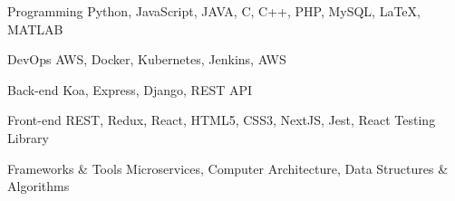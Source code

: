 

\begin{cvskills}

  \cvskill
    {Programming} %
    {Python, JavaScript, JAVA, C, C++, PHP, MySQL, LaTeX, MATLAB} %

  \cvskill
    {DevOps} %
    {AWS, Docker, Kubernetes, Jenkins, AWS } %

  \cvskill
    {Back-end} %
    {Koa, Express, Django, REST API} %

  \cvskill
    {Front-end} %
    {REST, Redux, React, HTML5, CSS3, NextJS, Jest, React Testing Library} %

  \cvskill
    {Frameworks \& Tools} %
    {Microservices, Computer Architecture, Data Structures \& Algorithms} %

\end{cvskills}
